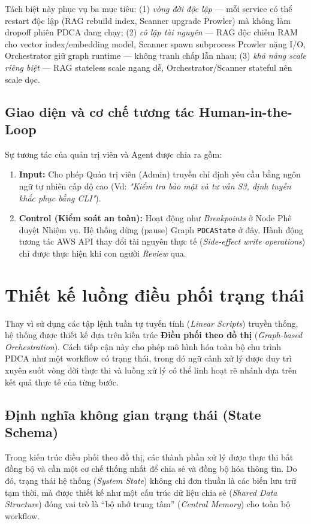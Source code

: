 Tách biệt này phục vụ ba mục tiêu: (1) \textit{vòng đời độc lập} — mỗi service có thể restart độc lập (RAG rebuild index, Scanner upgrade Prowler) mà không làm dropoff phiên PDCA đang chạy; (2) \textit{cô lập tài nguyên} — RAG độc chiếm RAM cho vector index/embedding model, Scanner spawn subprocess Prowler nặng I/O, Orchestrator giữ graph runtime — không tranh chấp lẫn nhau; (3) \textit{khả năng scale riêng biệt} — RAG stateless scale ngang dễ, Orchestrator/Scanner stateful nên scale dọc.

\subsection{Giao diện và cơ chế tương tác Human-in-the-Loop}
Sự tương tác của quản trị viên và Agent được chia ra gồm:
\begin{enumerate}
  \item \textbf{Input:} Cho phép Quản trị viên (Admin) truyền chỉ định yêu cầu bằng ngôn ngữ tự nhiên cấp độ cao (Vd: \textit{"Kiểm tra bảo mật và tư vấn S3, định tuyến khắc phục bằng CLI"}).
  \item \textbf{Control (Kiểm soát an toàn):} Hoạt động như \textit{Breakpoints} ở Node Phê duyệt Nhiệm vụ. Hệ thống dừng (pause) Graph \texttt{PDCAState} ở đây. Hành động tương tác AWS API thay đổi tài nguyên thực tế (\textit{Side-effect write operations}) chỉ được thực hiện khi con người \textit{Review} qua.
\end{enumerate}

\section{Thiết kế luồng điều phối trạng thái}
\label{sec:orchestration_design}

Thay vì sử dụng các tập lệnh tuần tự tuyến tính
(\textit{Linear Scripts}) truyền thống,
hệ thống được thiết kế dựa trên kiến trúc
\textbf{Điều phối theo đồ thị}
(\textit{Graph-based Orchestration}).
Cách tiếp cận này cho phép mô hình hóa toàn bộ
chu trình PDCA như một workflow có trạng thái,
trong đó ngữ cảnh xử lý được duy trì xuyên suốt
vòng đời thực thi
và luồng xử lý có thể linh hoạt rẽ nhánh
dựa trên kết quả thực tế của từng bước.

\subsection{Định nghĩa không gian trạng thái (State Schema)}

Trong kiến trúc điều phối theo đồ thị,
các thành phần xử lý được thực thi bất đồng bộ
và cần một cơ chế thống nhất
để chia sẻ và đồng bộ hóa thông tin.
Do đó, trạng thái hệ thống
(\textit{System State})
không chỉ đơn thuần là các biến lưu trữ tạm thời,
mà được thiết kế như một cấu trúc dữ liệu chia sẻ
(\textit{Shared Data Structure})
đóng vai trò là ``bộ nhớ trung tâm''
(\textit{Central Memory})
cho toàn bộ workflow.

